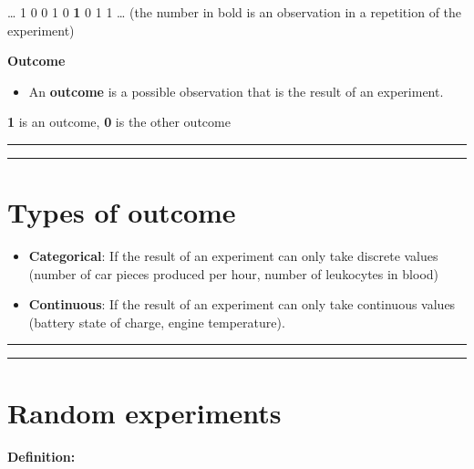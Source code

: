 \documentclass[
]{book}
\providecommand{\tightlist}{%
  \setlength{\itemsep}{0pt}\setlength{\parskip}{0pt}}
\begin{document}
\ldots{} 1 0 0 1 0 \textbf{1} 0 1 1 \ldots{} (the number in bold is an observation in a repetition of the experiment)

\textbf{Outcome}

\begin{itemize}
\tightlist
\item
  An \textbf{outcome} is a possible observation that is the result of an experiment.
\end{itemize}

\textbf{1} is an outcome, \textbf{0} is the other outcome

\begin{center}\rule{0.5\linewidth}{0.5pt}\end{center}

\begin{center}\rule{0.5\linewidth}{0.5pt}\end{center}

\hypertarget{types-of-outcome}{%
\section{Types of outcome}\label{types-of-outcome}}

\begin{itemize}
\tightlist
\item
  \textbf{Categorical}: If the result of an experiment can only take discrete values (number of car pieces produced per hour, number of leukocytes in blood)
\end{itemize}

\begin{itemize}
\tightlist
\item
  \textbf{Continuous}: If the result of an experiment can only take continuous values (battery state of charge, engine temperature).
\end{itemize}

\begin{center}\rule{0.5\linewidth}{0.5pt}\end{center}

\begin{center}\rule{0.5\linewidth}{0.5pt}\end{center}

\hypertarget{random-experiments}{%
\section{Random experiments}\label{random-experiments}}

\textbf{Definition:}
\end{document}
